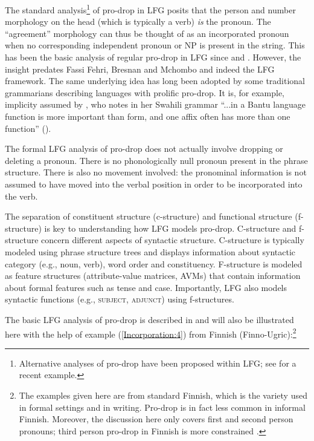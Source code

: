 \documentclass[output=paper,hidelinks]{langscibook}
\begin{document}
The standard analysis\footnote{Alternative analyses of pro-drop have been proposed within LFG; see \citet{Alsina2020} for a recent example.} of  pro-drop in LFG posits that  the  person and number morphology   on the  head (which is typically a verb)  \textit{is} the pronoun. The ``agreement'' morphology can  thus  be thought of  as an incorporated  pronoun  when no   corresponding independent  pronoun  or  NP is  present in the string.   This  has  been the basic  analysis of regular  pro-drop  in LFG  since   \citet{FassiFehri1984, FF, FF93} and \citet{BM87}. However, the insight predates   Fassi Fehri,  Bresnan and Mchombo and indeed the LFG framework.  The same underlying idea has long been  adopted by some traditional grammarians describing languages with prolific pro-drop.  It is, for example,  implicity assumed by \citet{ashton44}, who notes in her Swahili grammar ``...in a Bantu language function is more important than form, and one affix often has more than one function'' (\citeyear[8]{ashton44}).

The formal LFG analysis  of  pro-drop  does not  actually involve dropping  or  deleting  a  pronoun.    There is no phonologically  null pronoun present in the phrase  structure.  There is also no movement   involved: the  pronominal information  is not assumed to have moved  into the verbal  position in order to be  incorporated into the verb.   

The  separation  of constituent  structure (c-structure)  and  functional structure (f-structure) is key to understanding how   LFG  models   pro-drop.   
   C-structure and  f-structure concern different aspects of syntactic structure.  C-structure is   typically modeled  using phrase structure trees  and displays information about syntactic category  (e.g., noun, verb), word order  and  constituency. F-structure  is modeled as feature structures  (attribute-value matrices, AVMs) that contain  information about formal features  such  as  tense and case.   Importantly, LFG also   models syntactic functions  (e.g.,  \textsc{subject, adjunct}) using f-structures. 
   
 
The basic  LFG analysis of  pro-drop    is described in   and will  also be illustrated here  with the help of   example (\ref{Incorporation:4})  from   Finnish (Finno-Ugric):\footnote{The examples given here are from standard   Finnish,  which is the  variety used in formal settings and in writing. Pro-drop is in fact less common  in  informal Finnish. Moreover, the discussion here  only    covers first and second person pronouns; third person pro-drop in Finnish is more constrained \citep{holmberg20}.} 
\end{document}
